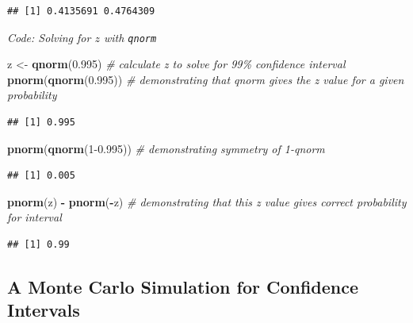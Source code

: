 \documentclass[
]{article}
\newenvironment{Shaded}{\begin{snugshade}}{\end{snugshade}}
\newcommand{\CommentTok}[1]{\textcolor[rgb]{0.56,0.35,0.01}{\textit{#1}}}
\newcommand{\DecValTok}[1]{\textcolor[rgb]{0.00,0.00,0.81}{#1}}
\newcommand{\FloatTok}[1]{\textcolor[rgb]{0.00,0.00,0.81}{#1}}
\newcommand{\KeywordTok}[1]{\textcolor[rgb]{0.13,0.29,0.53}{\textbf{#1}}}
\newcommand{\NormalTok}[1]{#1}
\newcommand{\OperatorTok}[1]{\textcolor[rgb]{0.81,0.36,0.00}{\textbf{#1}}}
\newcommand{\StringTok}[1]{\textcolor[rgb]{0.31,0.60,0.02}{#1}}
\begin{document}
\begin{verbatim}
## [1] 0.4135691 0.4764309
\end{verbatim}

\emph{Code: Solving for \(z\) with \texttt{qnorm}}

\begin{Shaded}
\begin{Highlighting}[]
\NormalTok{z \textless{}{-}}\StringTok{ }\KeywordTok{qnorm}\NormalTok{(}\FloatTok{0.995}\NormalTok{)    }\CommentTok{\# calculate z to solve for 99\% confidence interval}
\KeywordTok{pnorm}\NormalTok{(}\KeywordTok{qnorm}\NormalTok{(}\FloatTok{0.995}\NormalTok{))    }\CommentTok{\# demonstrating that qnorm gives the z value for a given probability}
\end{Highlighting}
\end{Shaded}

\begin{verbatim}
## [1] 0.995
\end{verbatim}

\begin{Shaded}
\begin{Highlighting}[]
\KeywordTok{pnorm}\NormalTok{(}\KeywordTok{qnorm}\NormalTok{(}\DecValTok{1}\FloatTok{{-}0.995}\NormalTok{))    }\CommentTok{\# demonstrating symmetry of 1{-}qnorm}
\end{Highlighting}
\end{Shaded}

\begin{verbatim}
## [1] 0.005
\end{verbatim}

\begin{Shaded}
\begin{Highlighting}[]
\KeywordTok{pnorm}\NormalTok{(z) }\OperatorTok{{-}}\StringTok{ }\KeywordTok{pnorm}\NormalTok{(}\OperatorTok{{-}}\NormalTok{z)    }\CommentTok{\# demonstrating that this z value gives correct probability for interval}
\end{Highlighting}
\end{Shaded}

\begin{verbatim}
## [1] 0.99
\end{verbatim}

\hypertarget{a-monte-carlo-simulation-for-confidence-intervals}{%
\subsection{A Monte Carlo Simulation for Confidence
Intervals}\label{a-monte-carlo-simulation-for-confidence-intervals}}
\end{document}
